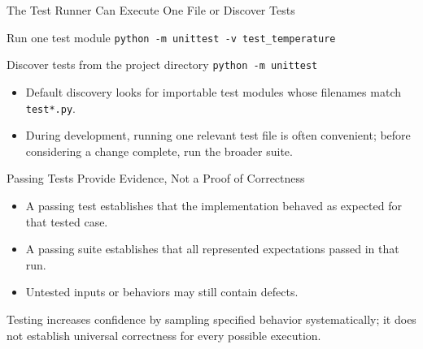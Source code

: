 \documentclass[aspectratio=169,10pt]{beamer}
\begin{document}
\begin{frame}{The Test Runner Can Execute One File or Discover Tests}
  \begin{block}{Run one test module}
    \texttt{python -m unittest -v test\_temperature}
  \end{block}

  \begin{block}{Discover tests from the project directory}
    \texttt{python -m unittest}
  \end{block}

  \begin{itemize}
    \item Default discovery looks for importable test modules whose filenames match \texttt{test*.py}.
    \item During development, running one relevant test file is often convenient; before considering a change complete, run the broader suite.
  \end{itemize}
\end{frame}

\begin{frame}{Passing Tests Provide Evidence, Not a Proof of Correctness}
  \begin{itemize}
    \item A passing test establishes that the implementation behaved as expected for that tested case.
    \item A passing suite establishes that all represented expectations passed in that run.
    \item Untested inputs or behaviors may still contain defects.
  \end{itemize}

  \begin{keyidea}
    Testing increases confidence by sampling specified behavior systematically; it does not establish universal correctness for every possible execution.
  \end{keyidea}
\end{frame}

\end{document}
